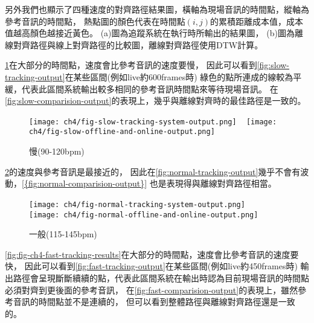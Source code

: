 \documentclass[class=NCU_thesis, crop=false]{standalone}
\begin{document}
另外我們也顯示了四種速度的對齊路徑結果圖，橫軸為現場音訊的時間點，縱軸為參考音訊的時間點，
熱點圖的顏色代表在時間點$(i, j)$的累積距離成本值，成本值越高顏色越接近黃色。
(a)圖為追蹤系統在執行時所輸出的結果圖，
(b)圖為離線對齊路徑與線上對齊路徑的比較圖，離線對齊路徑使用DTW計算。

\cref{fig:fig-ch4-slow-tracking-results}在大部分的時間點，速度會比參考音訊的速度要慢，
因此可以看到\cref{fig:slow-tracking-output}在某些區間(例如live約600frames時)
綠色的點所連成的線較為平緩，代表此區間系統輸出較多相同的參考音訊時間點來等待現場音訊。
在\cref{fig:slow-comparision-output}的表現上，幾乎與離線對齊時的最佳路徑是一致的。

\begin{figure}[H]
    \centering
    \subcaptionbox
    {
    \label{fig:slow-tracking-output}}
    {\texttt{[image: ch4/fig-slow-tracking-system-output.png]}}
    ~
    \subcaptionbox
    {
    \label{fig:slow-comparision-output}}
    {\texttt{[image: ch4/fig-slow-offline-and-online-output.png]}}
    \caption{慢(90-120bpm)}
    \label{fig:fig-ch4-slow-tracking-results}
\end{figure}

\cref{fig:fig-ch4-normal-tracking-results}的速度與參考音訊是最接近的，
因此在\cref{fig:normal-tracking-output}幾乎不會有波動，\cref{{fig:normal-comparision-output}}
也是表現得與離線對齊路徑相當。

\begin{figure}[H]
    \centering
    \subcaptionbox
    {
    \label{fig:normal-tracking-output}}
    {\texttt{[image: ch4/fig-normal-tracking-system-output.png]}}
    ~
    \subcaptionbox
    {
    \label{fig:normal-comparision-output}}
    {\texttt{[image: ch4/fig-normal-offline-and-online-output.png]}}
    \caption{一般(115-145bpm)}
    \label{fig:fig-ch4-normal-tracking-results}
\end{figure}

\cref{fig:fig-ch4-fast-tracking-results}在大部分的時間點，速度會比參考音訊的速度要快，
因此可以看到\cref{fig:fast-tracking-output}在某些區間(例如live約450frames時)
輸出路徑會呈現斷斷續續的點，代表此區間系統在輸出時認為目前現場音訊的時間點必須對齊到更後面的參考音訊，
在\cref{fig:fast-comparision-output}的表現上，雖然參考音訊的時間點並不是連續的，
但可以看到整體路徑與離線對齊路徑還是一致的。
\end{document}
